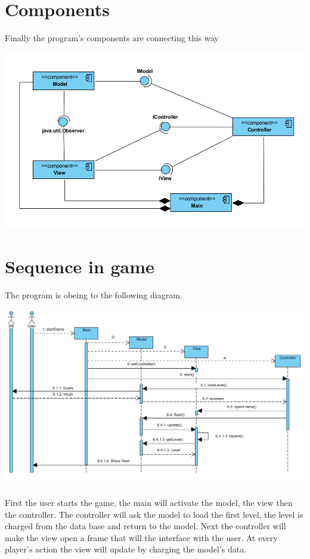 \documentclass{report}
\begin{document}
\clearpage

\section{Components}

Finally the program’s components are connecting this way

\begin{center}
\includegraphics[scale=0.7]{resources/components.png}
\end{center}

\section{Sequence in game}

The program is obeing to the following diagram.

\begin{center}
\includegraphics[scale=0.6]{resources/sequence.png}
\end{center}

First the user starts the game, the main will activate the model, the view then the controller. The controller will ask the model to load the first level, the level is charged from the data base and return to the model. Next the controller will make the view open a frame that will the interface with the user. At every player’s action the view will update by charging the model’s data.
\end{document}
